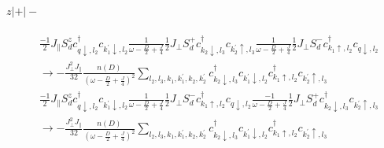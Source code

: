 \documentclass[12pt]{revtex4-2}
\begin{document}
\paragraph{\(z|+|-\)}
\begin{equation}\begin{aligned}
	&\frac{-1}{2}J_\parallel S_d^z c^\dagger_{q \downarrow, l_2}c_{k_1^\prime \downarrow, l_2}\frac{1}{\omega - \frac{D}{2} + \frac{J}{4}}\frac{1}{2}J_\perp S_d^+ c^\dagger_{k_2 \downarrow, l_3}c_{k_2^\prime \uparrow, l_3} \frac{1}{\omega - \frac{D}{2} + \frac{J}{4}} \frac{1}{2}J_\perp S_d^- c^\dagger_{k_1 \uparrow, l_2} c_{q \downarrow, l_2} \\
	&\longrightarrow -\frac{J_\perp^2 J_\parallel}{32} \frac{n(D)}{\left(\omega - \frac{D}{2} + \frac{J}{4}\right)^2}\sum_{l_2, l_3, k_1,k_1^\prime,k_2,k_2^\prime}c^\dagger_{k_2 \downarrow, l_3}c_{k_1^\prime \downarrow, l_2}c^\dagger_{k_1 \uparrow, l_2}c_{k_2^\prime \uparrow, l_3}
\end{aligned}\end{equation}
\begin{equation}\begin{aligned}
	&\frac{-1}{2}J_\parallel S_d^z c^\dagger_{q \downarrow, l_2}c_{k_1^\prime \downarrow, l_2} \frac{1}{\omega - \frac{D}{2} + \frac{J}{4}} \frac{1}{2}J_\perp S_d^- c^\dagger_{k_1 \uparrow, l_2} c_{q \downarrow, l_2} \frac{-1}{\omega - \frac{D}{2} + \frac{J}{4}}\frac{1}{2}J_\perp S_d^+ c^\dagger_{k_2 \downarrow, l_3}c_{k_2^\prime \uparrow, l_3} \\
	&\longrightarrow -\frac{J_\perp^2 J_\parallel}{32} \frac{n(D)}{\left(\omega - \frac{D}{2} + \frac{J}{4}\right)^2}\sum_{l_2, l_3, k_1,k_1^\prime,k_2,k_2^\prime}c^\dagger_{k_2 \downarrow, l_3}c_{k_1^\prime \downarrow, l_2}c^\dagger_{k_1 \uparrow, l_2}c_{k_2^\prime \uparrow, l_3}
\end{aligned}\end{equation}
\end{document}
